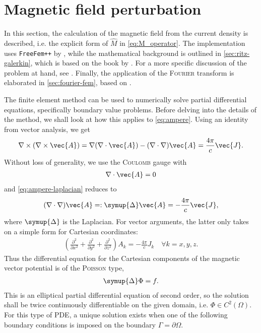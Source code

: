 \section{Magnetic field perturbation}
\label{sec:compute_Bn}

In this section, the calculation of the magnetic field from the current density is described, i.e. the explicit form of $\hat{M}$ in \cref{eq:M_operator}. The implementation uses \texttt{FreeFem++} by \textcite{Hecht12}, while the mathematical background is outlined in \cref{sec:ritz-galerkin}, which is based on the book by \textcite{Jin02}. For a more specific discussion of the problem at hand, see \cite{Seeber18}. Finally, the application of the \textsc{Fourier} transform is elaborated in \cref{sec:fourier-fem}, based on \cite{Albert19}.

The finite element method can be used to numerically solve partial differential equations, specifically boundary value problems. Before delving into the details of the method, we shall look at how this applies to \cref{eq:ampere}. Using an identity from vector analysis, we get
\begin{gather}
  \curl (\curl \vec{A}) = \grad (\divg \vec{A}) - (\nabla \cdot \nabla) \vec{A} = \frac{4 \pi}{c} \vec{J}. \label{eq:ampere-laplacian}
\end{gather}
Without loss of generality, we use the \textsc{Coulomb} gauge with
\begin{gather}
  \divg \vec{A} = 0
\end{gather}
and \cref{eq:ampere-laplacian} reduces to
\begin{gather}
  (\nabla \cdot \nabla) \vec{A} =: \symup{\Delta} \vec{A} = -\frac{4 \pi}{c} \vec{J},
\end{gather}
where $\symup{\Delta}$ is the Laplacian. For vector arguments, the latter only takes on a simple form for Cartesian coordinates:
\begin{gather}
  \left ( \frac{\partial^{2}}{\partial x^{2}} + \frac{\partial^{2}}{\partial y^{2}} + \frac{\partial^{2}}{\partial z^{2}} \right ) A_{k} = -\frac{4 \pi}{c} J_{k} \quad \forall k = x, y, z.
\end{gather}
Thus the differential equation for the Cartesian components of the magnetic vector potential is of the \textsc{Poisson} type,
\begin{gather}
  \symup{\Delta} \Phi = f.
\end{gather}
This is an elliptical partial differential equation of second order, so the solution shall be twice continuously differentiable on the given domain, i.e. $\Phi \in C^{2} (\Omega)$. For this type of PDE, a unique solution exists when one of the following boundary conditions is imposed on the boundary $\Gamma = \partial \Omega$.
